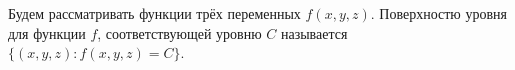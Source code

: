  Будем рассматривать функции трёх переменных $f(x,y,z)$. Поверхностю уровня
	 для функции $f$, соответствующей уровню $C$ называется $\big\{(x,y,z)\colon f(x,y,z) = C\big\}$.
	 